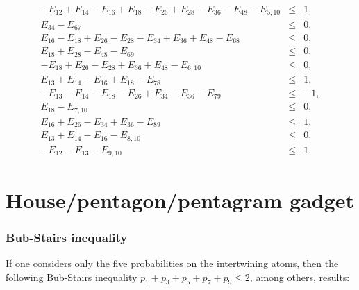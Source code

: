 \documentclass[%
 showpacs,
 showkeys,
 preprintnumbers,
 amsmath,amssymb,
 aps,
  pra,
  longbibliography,
 floatfix,
 ]{revtex4-1}
\begin{document}
\begin{eqnarray}
-E_{12} + E_{14} - E_{16} + E_{18} - E_{26} + E_{28} - E_{36} - E_{48} - E_{5,10} &\le&  1,                  \\
 E_{34} - E_{67} &\le&  0,                                                                                   \\
 E_{16} - E_{18} + E_{26} - E_{28} - E_{34} + E_{36} + E_{48} - E_{68} &\le&  0,                             \\
 E_{18} + E_{28} - E_{48} - E_{69} &\le&  0,                                                                 \\
-E_{18} + E_{26} - E_{28} + E_{36} + E_{48} - E_{6,10} &\le&  0,                                             \\
 E_{13} + E_{14} - E_{16} + E_{18} - E_{78} &\le&  1,                                                        \\
-E_{13} - E_{14} - E_{18} - E_{26} + E_{34} - E_{36} - E_{79} &\le&  -1,                                     \\
 E_{18} - E_{7,10} &\le&  0,                                                                                 \\
 E_{16} + E_{26} - E_{34} + E_{36} - E_{89} &\le&  1,                                                        \\
 E_{13} + E_{14} - E_{16} - E_{8,10} &\le&  0,                                                               \\
-E_{12} - E_{13} - E_{9,10} &\le&  1
.
\label{2017-b-kl-e-c}
\end{eqnarray}

\section{House/pentagon/pentagram gadget}

\subsubsection{Bub-Stairs inequality}

If one considers only the five probabilities on the intertwining atoms,
then the following Bub-Stairs inequality  $p_1+p_3+p_5+p_7+p_9  \le  2$, among others,
results:
\end{document}
